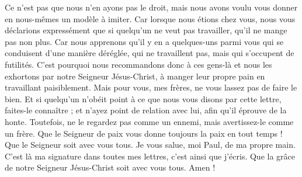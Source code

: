 \begin{multicols}{2}
Ce n’est pas que nous n'en ayons pas le droit, mais nous avons voulu vous donner en nous-mêmes un modèle à imiter.
Car lorsque nous étions chez vous, nous vous déclarions expressément que si quelqu'un ne veut pas travailler, qu'il ne mange pas non plus.
Car nous apprenons qu'il y en a quelques-uns parmi vous qui se conduisent d'une manière déréglée, qui ne travaillent pas, mais qui s’occupent de futilités.
C’est pourquoi nous recommandons donc à ces gens-là et nous les exhortons par notre Seigneur Jésus-Christ, à manger leur propre pain en travaillant paisiblement.
Mais pour vous, mes frères, ne vous lassez pas de faire le bien.
Et si quelqu'un n'obéit point à ce que nous vous disons par cette lettre, faites-le connaître ; et n’ayez point de relation avec lui, afin qu’il éprouve de la honte.
Toutefois, ne le regardez pas comme un ennemi, mais avertissez-le comme un frère.
\TextTitle{[Conclusion]}
Que le Seigneur de paix vous donne toujours la paix en tout temps ! Que le Seigneur soit avec vous tous.
Je vous salue, moi Paul, de ma propre main. C’est là ma signature dans toutes mes lettres, c'est ainsi que j'écris.
Que la grâce de notre Seigneur Jésus-Christ soit avec vous tous. Amen !
\PPE{}
\end{multicols}
